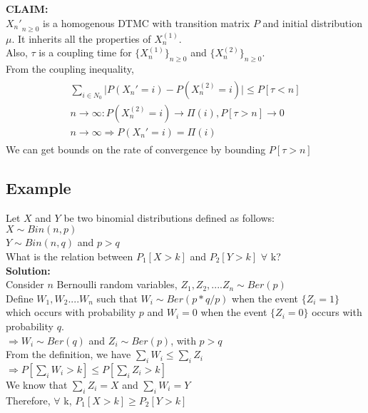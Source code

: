 \documentclass[a4paper,10pt,english]{article}
\begin{document}
\textbf{CLAIM:}\\
${X_n'}_{n \geq 0}$ is a homogenous DTMC with transition matrix $P$ and initial distribution $\mu$. It inherits all the properties of $X_n^{(1)}$.\\
Also, $\tau$ is a coupling time for $\{X_n^{(1)}\}_{n \geq 0}$ and $\{X_n^{(2)}\}_{n \geq 0}$.\\
From the coupling inequality,\\
\begin{eqnarray*}
\begin{aligned}
 \sum_{i \in N_0} \lvert P(X_n' = i) - P(X_n^{(2)} = i) \rvert \leq P[\tau < n]\\
 n \longrightarrow \infty:  P(X_n^{(2)} = i) \longrightarrow \Pi(i),  P[\tau > n] \longrightarrow 0\\
 n \longrightarrow \infty \Rightarrow P(X_n' = i) = \Pi(i) 
\end{aligned}
\end{eqnarray*}
We can get bounds on the rate of convergence by bounding $P[\tau > n]$

\subsection{Example}
Let $X$ and $Y$ be two binomial distributions defined as follows:\\
$X \sim Bin(n,p)$\\
$Y \sim Bin(n,q)$ and $p > q$\\
What is the relation between $P_1[X > k]$ and $P_2[Y > k]$  $\forall$ k?\\
\textbf{Solution:}\\
Consider $n$ Bernoulli random variables, $Z_1,Z_2,....Z_n \sim Ber(p)$\\
Define $W_1,W_2....W_n$ such that $W_i \sim Ber(p*q/p)$ when the event $\{Z_i = 1\}$ which occurs with probability $p$ and $W_i = 0$ when the event $\{Z_i = 0\}$
occurs with probability $q$.\\
$\Rightarrow W_i \sim Ber(q)$ and $Z_i \sim Ber(p)$, with $p > q$ \\
From the definition, we have $\sum_i W_i \leq \sum_i Z_i $\\
$\Rightarrow P[\sum_i W_i > k] \leq  P[\sum_i Z_i > k]$\\
We know that $\sum_i Z_i = X$ and $\sum_i W_i = Y$\\
Therefore, $\forall$ k, $P_1[X > k] \geq P_2[Y>k]$\\
\end{document}
